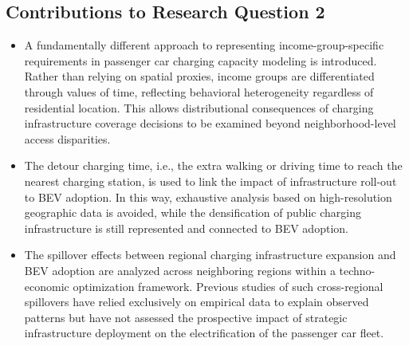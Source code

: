     \subsection{Contributions to Research Question 2}
    \begin{itemize}
        \item A fundamentally different approach to representing income-group-specific requirements in passenger car charging capacity modeling is introduced. Rather than relying on spatial proxies, income groups are differentiated through values of time, reflecting behavioral heterogeneity regardless of residential location. This allows distributional consequences of charging infrastructure coverage decisions to be examined beyond neighborhood-level access disparities.
        
        \item The detour charging time, i.e., the extra walking or driving time to reach the nearest charging station, is used to link the impact of infrastructure roll-out to \ac{BEV} adoption. In this way, exhaustive analysis based on high-resolution geographic data is avoided, while the densification of public charging infrastructure is still represented and connected to \ac{BEV} adoption.
        \item The spillover effects between regional charging infrastructure expansion and \ac{BEV} adoption are analyzed across neighboring regions within a techno-economic optimization framework. Previous studies of such cross-regional spillovers have relied exclusively on empirical data to explain observed patterns but have not assessed the prospective impact of strategic infrastructure deployment on the electrification of the passenger car fleet. 

    \end{itemize}
